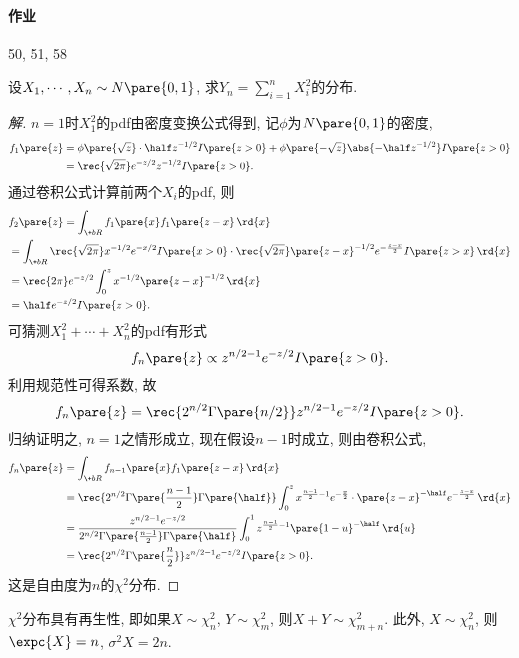 \documentclass[../Statistics.tex]{subfiles}
\begin{document}
\paragraph{作业} %
\label{par:作业}

50, 51, 58


\begin{sample}
    \begin{ex}
        设$X_1,\cdots,X_n\sim N\pare{0,1}$, 求$\displaystyle Y_n = \sum_{i=1}^n X_i^2$的分布.
    \end{ex}
    \begin{proof}[解]
        $n=1$时$X_1^2$的pdf由密度变换公式得到, 记$\phi$为$N\pare{0,1}$的密度,
        \begin{align*}
            f_1\pare{z} &= \phi\pare{\sqrt{z}}\cdot\half z^{-1/2} I\pare{z>0} + \phi\pare{-\sqrt{z}}\abs{-\half z^{-1/2}}I\pare{z>0} \\
            &= \rec{\sqrt{2\pi}}e^{-z/2}z^{-1/2}I\pare{z>0}.
        \end{align*}
        通过卷积公式计算前两个$X_i$的pdf, 则
        \begin{align*}
            & f_{2}\pare{z} = \int_{\+bR} f_1\pare{x}f_1\pare{z-x}\,\rd{x} \\
            &= \int_{\+bR} \rec{\sqrt{2\pi}} x^{-1/2}e^{-x/2}I\pare{x>0}\cdot \rec{\sqrt{2\pi}} \pare{z-x}^{-1/2} e^{-\frac{z-x}{2}} I\pare{z>x}\,\rd{x} \\
            &= \rec{2\pi}e^{-z/2}\int_0^z x^{-1/2}\pare{z-x}^{-1/2}\,\rd{x} \\
            &= \half e^{-z/2}I\pare{z>0}.
        \end{align*}
        可猜测$X_1^2 + \cdots + X_n^2$的pdf有形式
        \[ f_n\pare{z} \propto z^{n/2-1}e^{-z/2} I\pare{z>0}. \]
        利用规范性可得系数, 故
        \[ f_n\pare{z} = \rec{2^{n/2}\Gamma\pare{n/2}}z^{n/2-1}e^{-z/2}I\pare{z>0}. \]
        归纳证明之, $n=1$之情形成立, 现在假设$n-1$时成立, 则由卷积公式,
        \begin{align*}
            f_n\pare{z} &= \int_{\+bR} f_{n-1}\pare{x}f_1\pare{z-x}\,\rd{x} \\
            &= \rec{2^{n/2}\Gamma\pare{\frac{n-1}{2}}\Gamma\pare{\half}} \int_0^z x^{\frac{n-1}{2}-1}e^{-\frac{x}{2}}\cdot \pare{z-x}^{-\half} e^{-\frac{z-x}{2}}\,\rd{x} \\
            &= \frac{z^{n/2-1}e^{-z/2}}{2^{n/2}\Gamma\pare{\frac{n-1}{2}}\Gamma\pare{\half}} \int_0^1 z^{\frac{n-1}{2} - 1}\pare{1-u}^{-\half}\,\rd{u} \\
            &= \rec{2^{n/2}\Gamma\pare{\frac{n}{2}}}z^{n/2-1}e^{-z/2}I\pare{z>0}.
        \end{align*}
        这是自由度为$n$的$\chi^2$分布.
    \end{proof}
    $\chi^2$分布具有再生性, 即如果$X\sim \chi_n^2$, $Y\sim \chi_m^2$, 则$X+Y\sim \chi_{m+n}^2$. 此外, $X\sim \chi_n^2$, 则$\expc{X}=n$, $\sigma^2 X = 2n$.
\end{sample}
\end{document}
